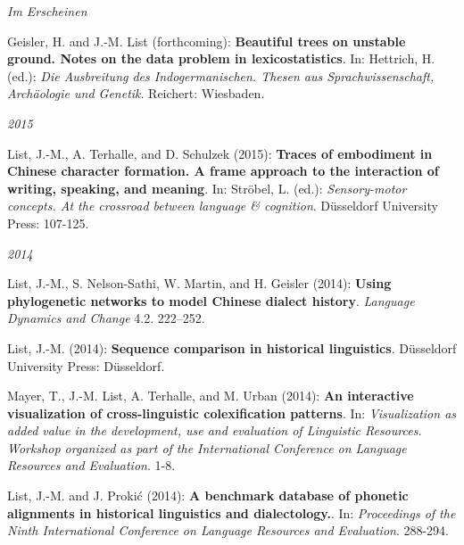 \noindent\textit{{Im Erscheinen}}\par\nopagebreak\vspace{0.25cm}
\nopagebreak\noindent Geisler, H. and J.-M. List (forthcoming): \textbf{Beautiful trees on unstable ground. Notes on the data problem in lexicostatistics}. In: Hettrich, H. (ed.): \textit{Die Ausbreitung des Indogermanischen. Thesen aus Sprachwissenschaft, Archäologie und Genetik}. Reichert: Wiesbaden. \vspace{0.25cm}
\par
\noindent\textit{2015}\par\nopagebreak\vspace{0.25cm}
\nopagebreak\noindent List, J.-M., A. Terhalle, and D. Schulzek (2015): \textbf{Traces of embodiment in Chinese character formation. A frame approach to the interaction of writing, speaking, and meaning}. In: Ströbel, L. (ed.): \textit{Sensory-motor concepts. At the crossroad between language \& cognition}. Düsseldorf University Press: 107-125.\vspace{0.25cm}
\par
\noindent\textit{2014}\par\nopagebreak\vspace{0.25cm}
\nopagebreak\noindent List, J.-M., S. Nelson-Sathi, W. Martin, and H. Geisler (2014): \textbf{Using phylogenetic networks to model Chinese dialect history}. \textit{Language Dynamics and Change} 4.2. 222–252.\vspace{0.25cm}
\par
\nopagebreak\noindent List, J.-M. (2014): \textbf{Sequence comparison in historical linguistics}. Düsseldorf University Press: Düsseldorf.\vspace{0.25cm}
\par
\nopagebreak\noindent Mayer, T., J.-M. List, A. Terhalle, and M. Urban (2014): \textbf{An interactive visualization of cross-linguistic colexification patterns}. In: \textit{Visualization as added value in the development, use and evaluation of Linguistic Resources. Workshop organized as part of the International Conference on Language Resources and Evaluation}. 1-8.\vspace{0.25cm}
\par
\nopagebreak\noindent List, J.-M. and J. Prokić (2014): \textbf{A benchmark database of phonetic alignments in historical linguistics and dialectology.}. In: \textit{Proceedings of the Ninth International Conference on Language Resources and Evaluation}. 288-294.\vspace{0.25cm}
